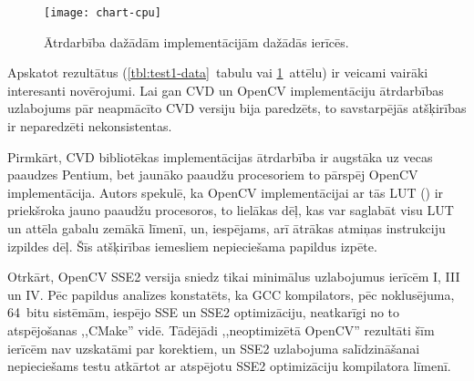 \begin{figure}[tbh]
	\centering
	\texttt{[image: chart-cpu]}
	\caption{Ātrdarbība dažādām implementācijām dažādās ierīcēs.}
	\label{fig:test1-data}
\end{figure}

Apskatot rezultātus (\ref{tbl:test1-data}~tabulu vai \ref{fig:test1-data}~attēlu)
ir veicami vairāki interesanti novērojumi. Lai gan CVD un OpenCV implementāciju
ātrdarbības uzlabojums pār neapmācīto CVD versiju bija paredzēts, to
savstarpējās atšķirības ir neparedzēti nekonsistentas.

Pirmkārt, CVD bibliotēkas implementācijas ātrdarbība ir augstāka uz vecas
paaudzes Pentium, bet jaunāko paaudžu procesoriem to pārspēj OpenCV
implementācija. Autors spekulē, ka OpenCV implementācijai ar tās LUT 
() ir priekšroka
jauno paaudžu procesoros, to lielākas  dēļ, kas var saglabāt
visu LUT un attēla gabalu zemākā  līmenī, un, iespējams,
arī ātrākas atmiņas instrukciju izpildes dēļ. Šīs atšķirības iemesliem
nepieciešama papildus izpēte.

Otrkārt, OpenCV SSE2 versija sniedz tikai minimālus uzlabojumus ierīcēm
I, III un IV. Pēc papildus analīzes konstatēts, ka GCC kompilators,
pēc noklusējuma, 64~bitu sistēmām, iespējo SSE un SSE2 optimizāciju,
neatkarīgi no to atspējošanas ,,CMake'' vidē.
Tādējādi ,,neoptimizētā OpenCV'' rezultāti
šīm ierīcēm nav uzskatāmi par korektiem, un SSE2 uzlabojuma
salīdzināšanai nepieciešams testu atkārtot ar atspējotu SSE2 optimizāciju
kompilatora līmenī.
